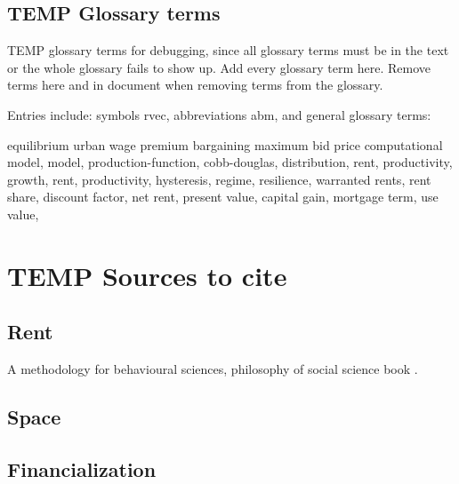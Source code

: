 
\section{TEMP Glossary terms}

TEMP glossary terms for debugging, since all glossary terms must be in the text or the whole glossary fails to show up. Add every glossary term here. Remove terms here and in document when removing terms from the glossary. %

Entries include:  
symbols \gls{rvec}, 
abbreviations \gls{abm}, 
and general glossary terms:

\gls{equilibrium}
\gls{urban wage premium}
\gls{bargaining}
\gls{maximum bid price}
\gls{computational model}, 
\gls{model},  
\gls{production-function}, 
\gls{cobb-douglas}, 
\gls{distribution},
\gls{rent}, 
\gls{productivity}, 
\gls{growth}, 
\gls{rent}, 
\gls{productivity}, 
\gls{hysteresis}, 
\gls{regime}, 
\gls{resilience}, 
\gls{warranted rents}, 
\gls{rent share},
\gls{discount factor},
\gls{net rent}, 
\gls{present value}, 
\gls{capital gain},
\gls{mortgage term},
\gls{use value},


\chapter{TEMP Sources to cite}

\section{Rent}
A methodology for behavioural sciences, philosophy of social science book \cite{kaplanConductInquiryMethodology2017}.


\section{Space}


\section{Financialization}



